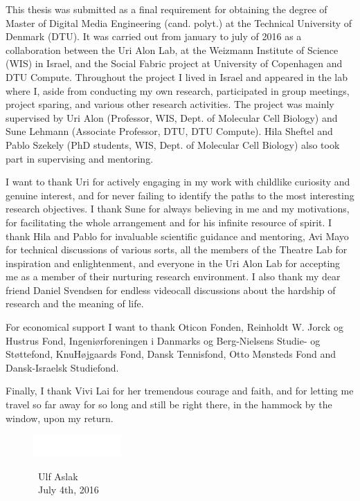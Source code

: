 This thesis was submitted as a final requirement for obtaining the degree of Master of Digital Media Engineering (cand. polyt.) at the Technical University of Denmark (DTU). It was carried out from january to july of 2016 as a collaboration between the Uri Alon Lab, at the Weizmann Institute of Science (WIS) in Israel, and the Social Fabric project at University of Copenhagen and DTU Compute. Throughout the project I lived in Israel and appeared in the lab where I, aside from conducting my own research, participated in group meetings, project sparing, and various other research activities. The project was mainly supervised by Uri Alon (Professor, WIS, Dept. of Molecular Cell Biology) and Sune Lehmann (Associate Professor, DTU, DTU Compute). Hila Sheftel and Pablo Szekely (PhD students, WIS, Dept. of Molecular Cell Biology) also took part in supervising and mentoring. 

I want to thank Uri for actively engaging in my work with childlike curiosity and genuine interest, and for never failing to identify the paths to the most interesting research objectives. I thank Sune for always believing in me and my motivations, for facilitating the whole arrangement and for his infinite resource of spirit. I thank Hila and Pablo for invaluable scientific guidance and mentoring, Avi Mayo for technical discussions of various sorts, all the members of the Theatre Lab for inspiration and enlightenment, and everyone in the Uri Alon Lab for accepting me as a member of their nurturing research environment. I also thank my dear friend Daniel Svendsen for endless videocall discussions about the hardship of research and the meaning of life.

For economical support I want to thank Oticon Fonden, Reinholdt W. Jorck og Hustrus Fond, Ingeni\o rforeningen i Danmarks og Berg-Nielsens Studie- og St\o ttefond, KnuH\o jgaards Fond, Dansk Tennisfond, Otto M\o nsteds Fond and Dansk-Israelsk Studiefond.

Finally, I thank Vivi Lai for her tremendous courage and faith, and for letting me travel so far away for so long and still be right there, in the hammock by the window, upon my return.

\begin{figure}[!ht]
	\begin{minipage}[l]{\textwidth}
		\flushleft
		\includegraphics[width=0.3\textwidth]{figures/underskrift}
	\end{minipage}
	\begin{minipage}[l]{\textwidth}
		\flushleft
		$\,\,\,$Ulf Aslak\\
		$\,\,\,$July 4th, 2016
	\end{minipage}
\end{figure}